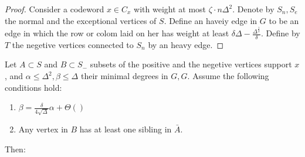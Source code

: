  \begin{proof}
   Consider a codeword $x \in C_{x}$ with weight at most $\zeta \cdot n\Delta^{2} $. Denote by $S_{n}, S_{e}$ the normal and the exceptional vertices of $S$. Define an haveiy edge in $G$ to be an edge in which the row or colom laid on her has weight at least $\delta\Delta - \frac{\Delta^{\frac{1}{2}}}{\delta}$. Define by $T$ the negetive vertices connected to $S_{n}$ by an heavy edge.     
 \end{proof}
 
 \begin{claim}  
   \label{cliam:tech} Let $A \subset S$ and $B \subset S_{-}$ subsets of the positive and the negetive vertices support $x$, and $\alpha \le \Delta^{2},\beta \le \Delta$ their minimal degrees in $G, G$. Assume the following conditions hold:
   \begin{enumerate}
     \item $\beta = \frac{\delta}{4 \sqrt{\Delta}}\alpha + \Theta\left(  \right)$
     \item Any vertex in $B$ has at least one sibling in $\bar{A}$.
   \end{enumerate}
   Then:
 \end{claim}

